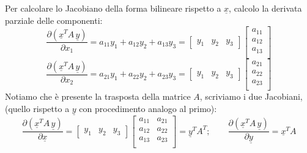 Per calcolare lo Jacobiano della forma bilineare rispetto a $\underline{x}$, calcolo la derivata parziale delle componenti:
\begin{equation*}
	\frac{\partial(\underline{x}^TA\,\underline{y})}{\partial x_1} = a_{11}y_1 + a_{12}y_2 + a_{13}y_3 = 
	\begin{bmatrix}
		y_1 & y_2 & y_3	
	\end{bmatrix}
	\begin{bmatrix}
		a_{11} \\
		a_{12} \\
		a_{13} \\
	\end{bmatrix}
\end{equation*}
\begin{equation*}
	\frac{\partial(\underline{x}^TA\,\underline{y})}{\partial x_2} = a_{21}y_1 + a_{22}y_2 + a_{23}y_3 = 
	\begin{bmatrix}
		y_1 & y_2 & y_3	
	\end{bmatrix}
	\begin{bmatrix}
		a_{21} \\
		a_{22} \\
		a_{23} \\
	\end{bmatrix}
\end{equation*}
Notiamo che è presente la trasposta della matrice $A$, scriviamo i due Jacobiani, (quello rispetto a $\underline{y}$ con procedimento analogo al primo):
\begin{equation*}
	\frac{\partial(\underline{x}^TA\,\underline{y})}{\partial \underline{x}} =
	\begin{bmatrix}
		y_1 & y_2 & y_3
	\end{bmatrix}
	\begin{bmatrix}
		a_{11} & a_{21} \\
		a_{12} & a_{22} \\
		a_{13} & a_{23} \\
	\end{bmatrix}
	= \underline{y}^TA^T
	;\qquad
	\frac{\partial(\underline{x}^TA\,\underline{y})}{\partial \underline{y}} = \underline{x}^TA
\end{equation*} 

